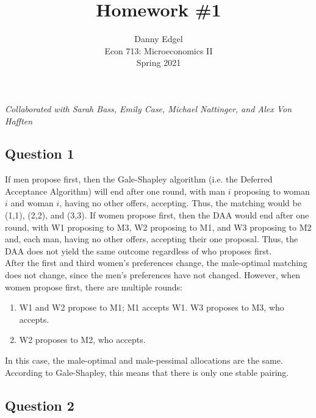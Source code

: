\documentclass{article}
\begin{document}
\title{	Homework \#1 }
\author{ 	Danny Edgel 					\\ 
			Econ 713: Microeconomics II		\\
			Spring 2021						\\
		}
\maketitle\thispagestyle{empty}

\noindent\textit{Collaborated with Sarah Bass, Emily Case, Michael Nattinger, and Alex Von Hafften}


\subsection*{Question 1}
If men propose first, then the Gale-Shapley algorithm (i.e. the Deferred Acceptance Algorithm) will end after one round, with man $i$ proposing to woman $i$ and woman $i$, having no other offers, accepting. Thus, the matching would be (1,1), (2,2), and (3,3). If women propose first, then the DAA would end after one round, with W1 proposing to M3, W2 proposing to M1, and W3 proposing to M2 and, each man, having no other offers, accepting their one proposal. Thus, the DAA does not yield the same outcome regardless of who proposes first.
\medskip \\
After the first and third women's preferences change, the male-optimal matching does not change, since the men's preferences have not changed. However, when women propose first, there are multiple rounds:
\begin{enumerate}
	\item W1 and W2 propose to M1; M1 accepts W1. W3 proposes to M3, who accepts.
	\item W2 proposes to M2, who accepts.
\end{enumerate}
In this case, the male-optimal and male-pessimal allocations are the same. According to Gale-Shapley, this means that there is only one stable pairing.


\subsection*{Question 2}
\end{document}
